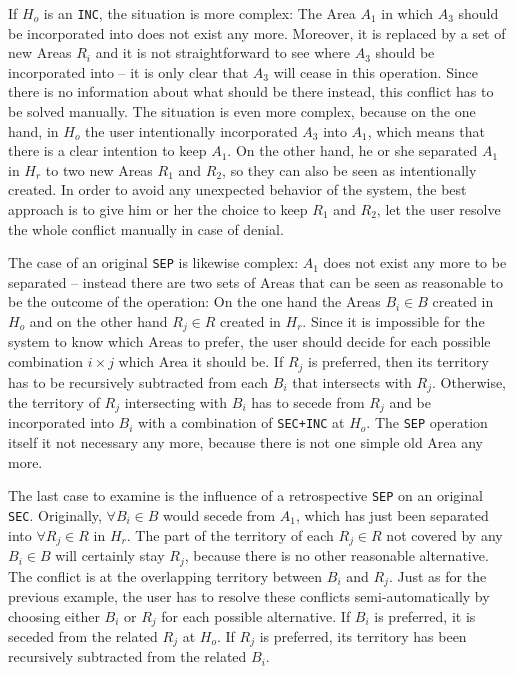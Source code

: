 If $H_o$ is an \texttt{INC}, the situation is more complex: The Area $A_1$ in which $A_3$ should be incorporated into does not exist any more. Moreover, it is replaced by a set of new Areas $R_i$ and it is not straightforward to see where $A_3$ should be incorporated into -- it is only clear that $A_3$ will cease in this operation. Since there is no information about what should be there instead, this conflict has to be solved manually. The situation is even more complex, because on the one hand, in $H_o$ the user intentionally incorporated $A_3$ into $A_1$, which means that there is a clear intention to keep $A_1$. On the other hand, he or she separated $A_1$ in $H_r$ to two new Areas $R_1$ and $R_2$, so they can also be seen as intentionally created. In order to avoid any unexpected behavior of the system, the best approach is to give him or her the choice to keep $R_1$ and $R_2$, let the user resolve the whole conflict manually in case of denial.

The case of an original \texttt{SEP} is likewise complex: $A_1$ does not exist any more to be separated -- instead there are two sets of Areas that can be seen as reasonable to be the outcome of the operation: On the one hand the Areas $B_i \in B$ created in $H_o$ and on the other hand $R_j \in R$ created in $H_r$. Since it is impossible for the system to know which Areas to prefer, the user should decide for each possible combination $i \times j$ which Area it should be. If $R_j$ is preferred, then its territory has to be recursively subtracted from each $B_i$ that intersects with $R_j$. Otherwise, the territory of $R_j$ intersecting with $B_i$ has to secede from $R_j$ and be incorporated into $B_i$ with a combination of \texttt{SEC+INC} at $H_o$. The \texttt{SEP} operation itself it not necessary any more, because there is not one simple old Area any more.

The last case to examine is the influence of a retrospective \texttt{SEP} on an original \texttt{SEC}. Originally, $\forall B_i \in B$ would secede from $A_1$, which has just been separated into $\forall R_j \in R$ in $H_r$. The part of the territory of each $R_j \in R$ not covered by any $B_i \in B$ will certainly stay $R_j$, because there is no other reasonable alternative. The conflict is at the overlapping territory between $B_i$ and $R_j$. Just as for the previous example, the user has to resolve these conflicts semi-automatically by choosing either $B_i$ or $R_j$ for each possible alternative. If $B_i$ is preferred, it is seceded from the related $R_j$ at $H_o$. If $R_j$ is preferred, its territory has been recursively subtracted from the related $B_i$.

